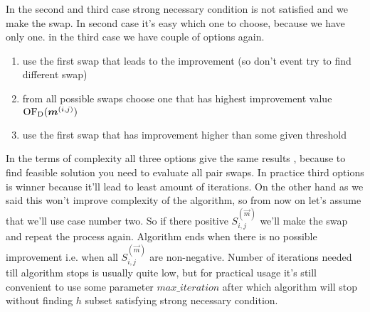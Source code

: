 In the second and third case strong necessary condition is not satisfied and we make the swap. In second case it's easy which one to choose, because we have only one. in the third case we have couple of options again. 
\begin{enumerate}
	\item use the first swap that leads to the improvement (so don't event try to find different swap)
	\item from all possible swaps choose one that has highest improvement value  $\operatorname{OF_D}(\boldsymbol{m}^{(i,j)})$
	\item use the first swap that has improvement higher than some given threshold
\end{enumerate}
In the terms of complexity all three options give the same results , because to find feasible solution you need to evaluate all pair swaps. In practice third options is winner because it'll lead to least amount of iterations. On the other hand as we said this won't improve complexity of the algorithm, so from now on let's assume that we'll use case number two.
So if there positive  $S^{(\vec{m})}_{i,j}$ we'll make the swap and repeat the process again. 
Algorithm ends when there is no possible improvement i.e. when all $S^{(\vec{m})}_{i,j}$ are non-negative.
Number of iterations needed till algorithm stops is usually quite low, but for practical usage it's still convenient to use some parameter $max\_iteration$ after which algorithm will stop without finding $h$ subset satisfying strong necessary condition. 





